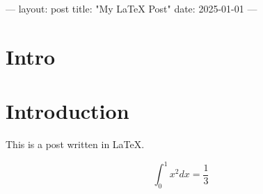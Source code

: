 ---
layout: post
title: "My LaTeX Post"
date: 2025-01-01
---

\section{Intro}


\section{Introduction}

This is a post written in LaTeX.

\[
\int_0^1 x^2 dx = \frac{1}{3}
\]
